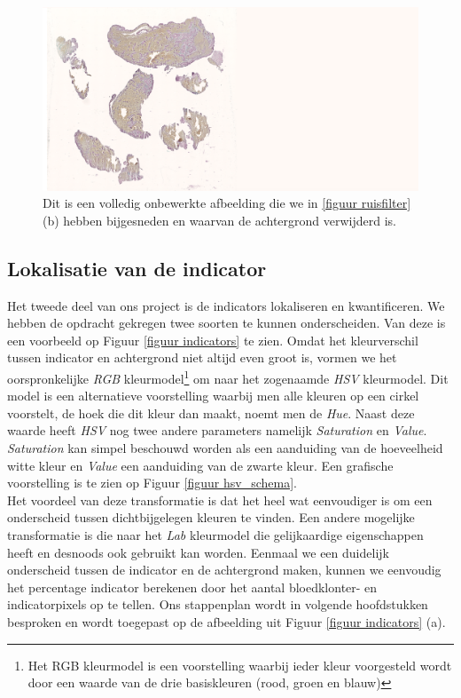 \documentclass[a4paper,kulak]{kulakarticle}
\begin{document}
	\begin{figure}[H]
		\centering
		\includegraphics[width=15.25cm]{Volledig_onbewerkt}
		
		\caption{Dit is een volledig onbewerkte afbeelding die we in \ref{figuur ruisfilter} (b) hebben bijgesneden en waarvan de achtergrond verwijderd is.}
		\label{figuur volledig_onbewerkt}
	\end{figure}
	\newpage
	\subsection{Lokalisatie van de indicator}
		Het tweede deel van ons project is de indicators lokaliseren en kwantificeren. We hebben de opdracht gekregen twee soorten te kunnen onderscheiden. Van deze is een voorbeeld op Figuur \ref{figuur indicators} te zien. Omdat het kleurverschil tussen indicator en achtergrond niet altijd even groot is, vormen we het oorspronkelijke \textit{RGB} kleurmodel\footnote{Het RGB kleurmodel is een voorstelling waarbij ieder kleur voorgesteld wordt door een waarde van de drie basiskleuren (rood, groen en blauw)} om naar het zogenaamde \textit{HSV} kleurmodel. Dit model is een alternatieve voorstelling waarbij men alle kleuren op een cirkel voorstelt, de hoek die dit kleur dan maakt, noemt men de \textit{Hue}. Naast deze waarde heeft \textit{HSV} nog twee andere parameters namelijk \textit{Saturation} en \textit{Value}. \textit{Saturation} kan simpel beschouwd worden als een aanduiding van de hoeveelheid witte kleur en \textit{Value} een aanduiding van de zwarte kleur. Een grafische voorstelling is te zien op Figuur \ref{figuur hsv_schema}.\\
		Het voordeel van deze transformatie is dat het heel wat eenvoudiger is om een onderscheid tussen dichtbijgelegen kleuren te vinden. Een andere mogelijke transformatie is die naar het \textit{Lab} kleurmodel die gelijkaardige eigenschappen heeft en desnoods ook gebruikt kan worden. Eenmaal we een duidelijk onderscheid tussen de indicator en de achtergrond maken, kunnen we eenvoudig het percentage indicator berekenen door het aantal bloedklonter- en indicatorpixels op te tellen. Ons stappenplan wordt in volgende hoofdstukken besproken en wordt toegepast op de afbeelding uit Figuur \ref{figuur indicators} (a).
	
\end{document}

